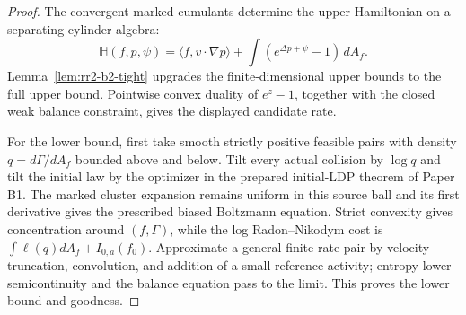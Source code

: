 \begin{proof}
The convergent marked cumulants determine the upper Hamiltonian on a
separating cylinder algebra:
\[
 \mathbb H(f,p,\psi)=
 \langle f,v\cdot\nabla p\rangle+
 \int(e^{\Delta p+\psi}-1)\,dA_f .
\]
Lemma~\ref{lem:rr2-b2-tight} upgrades the finite-dimensional upper bounds to
the full upper bound.  Pointwise convex duality of \(e^z-1\), together with
the closed weak balance constraint, gives the displayed candidate rate.

For the lower bound, first take smooth strictly positive feasible pairs with
density \(q=d\Gamma/dA_f\) bounded above and below.  Tilt every actual
collision by \(\log q\) and tilt the initial law by the optimizer in
the prepared initial-LDP theorem of Paper B1.  The marked cluster expansion remains
uniform in this source ball and its first derivative gives the prescribed
biased Boltzmann equation.  Strict convexity gives concentration around
\((f,\Gamma)\), while the log Radon--Nikodym cost is
\(\int\ell(q)dA_f+I_{0,a}(f_0)\).
Approximate a general finite-rate pair by velocity truncation, convolution,
and addition of a small reference activity; entropy lower semicontinuity and
the balance equation pass to the limit.  This proves the lower bound and
goodness.
\end{proof}
